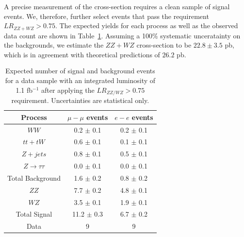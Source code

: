 A precise measurement of the cross-section requires a clean sample of signal events. We, therefore, further select events
that pass the requirement $LR_{ZZ+WZ}>0.75$.  The expected yields for each process as well as the observed data count
are  shown in Table~\ref{tab:ZZWZselection}.
Assuming a 100$\%$ systematic unceratainty on the backgrounds, we estimate the $ZZ+WZ$ 
cross-section to be $22.8 \pm 3.5$ pb, which is in agreement with theoretical predictions of $26.2$ pb.

\begin{table}[!hbtp]
  \begin{center}
  \begin{tabular} {c|c|c}
 \hline
  Process & $\mu-\mu$ events  & $e-e$ events \\
  \hline
  \hline
  $WW$                  &  0.2 $\pm$  0.1 &  0.2 $\pm$   0.1 \\
  $tt + tW$             &  0.6 $\pm$  0.1 &  0.1 $\pm$   0.1 \\
  $Z  + jets$           &  0.8 $\pm$  0.1 &  0.5 $\pm$   0.1\\
  $Z\rightarrow \tau\tau$& 0.0 $\pm$  0.1 &  0.0 $\pm$   0.1\\
  \hline
  Total Background      &  1.6 $\pm$  0.2 &  0.8 $\pm$   0.2\\
  \hline
  $ZZ$                  &  7.7 $\pm$  0.2 &  4.8 $\pm$   0.1\\
  $WZ$                  &  3.5  $\pm$ 0.1 &  1.9 $\pm$   0.1\\
 \hline
  Total Signal          &  11.2 $\pm$ 0.3 &  6.7 $\pm$   0.2\\
 \hline
  Data                  &  9               &   9              \\
 \hline
  \end{tabular}

  \caption{Expected number of signal and background events for a data sample with an 
  integrated luminosity of 1.1 fb$^{-1}$ after applying the $LR_{ZZ/WZ}>0.75$ requirement. 
 Uncertainties are statistical only.}
   \label{tab:ZZWZselection}
  \end{center}
\end{table}
